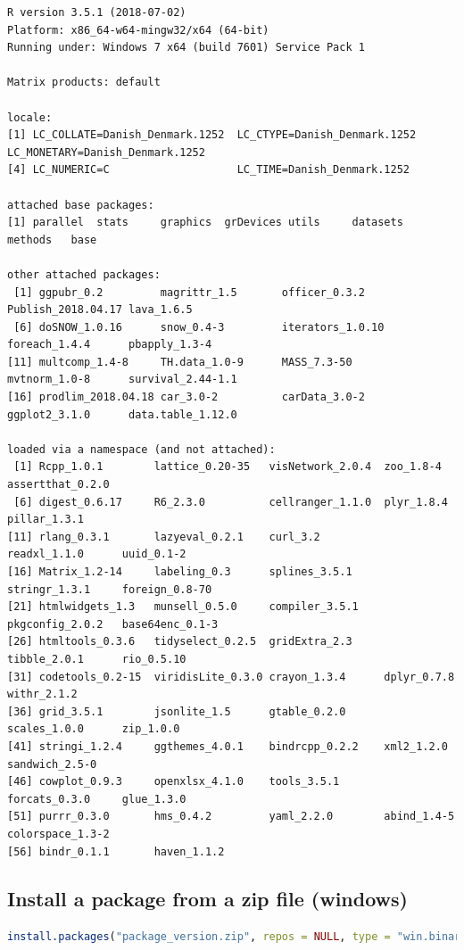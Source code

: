 \documentclass{article}
\begin{document}
\label{}
\begin{verbatim}
R version 3.5.1 (2018-07-02)
Platform: x86_64-w64-mingw32/x64 (64-bit)
Running under: Windows 7 x64 (build 7601) Service Pack 1

Matrix products: default

locale:
[1] LC_COLLATE=Danish_Denmark.1252  LC_CTYPE=Danish_Denmark.1252    LC_MONETARY=Danish_Denmark.1252
[4] LC_NUMERIC=C                    LC_TIME=Danish_Denmark.1252    

attached base packages:
[1] parallel  stats     graphics  grDevices utils     datasets  methods   base     

other attached packages:
 [1] ggpubr_0.2         magrittr_1.5       officer_0.3.2      Publish_2018.04.17 lava_1.6.5        
 [6] doSNOW_1.0.16      snow_0.4-3         iterators_1.0.10   foreach_1.4.4      pbapply_1.3-4     
[11] multcomp_1.4-8     TH.data_1.0-9      MASS_7.3-50        mvtnorm_1.0-8      survival_2.44-1.1 
[16] prodlim_2018.04.18 car_3.0-2          carData_3.0-2      ggplot2_3.1.0      data.table_1.12.0 

loaded via a namespace (and not attached):
 [1] Rcpp_1.0.1        lattice_0.20-35   visNetwork_2.0.4  zoo_1.8-4         assertthat_0.2.0 
 [6] digest_0.6.17     R6_2.3.0          cellranger_1.1.0  plyr_1.8.4        pillar_1.3.1     
[11] rlang_0.3.1       lazyeval_0.2.1    curl_3.2          readxl_1.1.0      uuid_0.1-2       
[16] Matrix_1.2-14     labeling_0.3      splines_3.5.1     stringr_1.3.1     foreign_0.8-70   
[21] htmlwidgets_1.3   munsell_0.5.0     compiler_3.5.1    pkgconfig_2.0.2   base64enc_0.1-3  
[26] htmltools_0.3.6   tidyselect_0.2.5  gridExtra_2.3     tibble_2.0.1      rio_0.5.10       
[31] codetools_0.2-15  viridisLite_0.3.0 crayon_1.3.4      dplyr_0.7.8       withr_2.1.2      
[36] grid_3.5.1        jsonlite_1.5      gtable_0.2.0      scales_1.0.0      zip_1.0.0        
[41] stringi_1.2.4     ggthemes_4.0.1    bindrcpp_0.2.2    xml2_1.2.0        sandwich_2.5-0   
[46] cowplot_0.9.3     openxlsx_4.1.0    tools_3.5.1       forcats_0.3.0     glue_1.3.0       
[51] purrr_0.3.0       hms_0.4.2         yaml_2.2.0        abind_1.4-5       colorspace_1.3-2 
[56] bindr_0.1.1       haven_1.1.2
\end{verbatim}
\subsection{Install a package from a zip file (windows)}
\label{sec:orgf690fcc}
\begin{lstlisting}[language=r,numbers=none]
install.packages("package_version.zip", repos = NULL, type = "win.binary")
\end{lstlisting}
\end{document}
